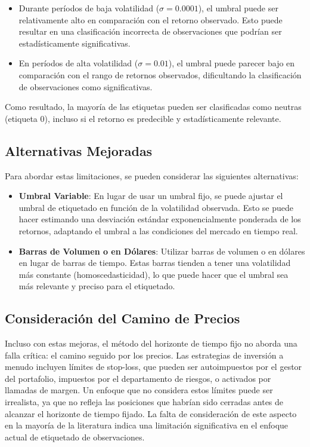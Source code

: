 \documentclass[a4paper,12pt]{report}
\begin{document}
\begin{itemize}
    \item Durante períodos de baja volatilidad (\(\sigma = 0.0001\)), el umbral puede ser relativamente alto en comparación con el retorno observado. Esto puede resultar en una clasificación incorrecta de observaciones que podrían ser estadísticamente significativas.
    \item En períodos de alta volatilidad (\(\sigma = 0.01\)), el umbral puede parecer bajo en comparación con el rango de retornos observados, dificultando la clasificación de observaciones como significativas.
\end{itemize}

Como resultado, la mayoría de las etiquetas pueden ser clasificadas como neutras (etiqueta 0), incluso si el retorno es predecible y estadísticamente relevante.

\subsection{Alternativas Mejoradas}

Para abordar estas limitaciones, se pueden considerar las siguientes alternativas:

\begin{itemize}
    \item \textbf{Umbral Variable}: En lugar de usar un umbral fijo, se puede ajustar el umbral de etiquetado en función de la volatilidad observada. Esto se puede hacer estimando una desviación estándar exponencialmente ponderada de los retornos, adaptando el umbral a las condiciones del mercado en tiempo real.
    \item \textbf{Barras de Volumen o en Dólares}: Utilizar barras de volumen o en dólares en lugar de barras de tiempo. Estas barras tienden a tener una volatilidad más constante (homoscedasticidad), lo que puede hacer que el umbral sea más relevante y preciso para el etiquetado.
\end{itemize}

\subsection{Consideración del Camino de Precios}

Incluso con estas mejoras, el método del horizonte de tiempo fijo no aborda una falla crítica: el camino seguido por los precios. Las estrategias de inversión a menudo incluyen límites de stop-loss, que pueden ser autoimpuestos por el gestor del portafolio, impuestos por el departamento de riesgos, o activados por llamadas de margen. Un enfoque que no considera estos límites puede ser irrealista, ya que no refleja las posiciones que habrían sido cerradas antes de alcanzar el horizonte de tiempo fijado. La falta de consideración de este aspecto en la mayoría de la literatura indica una limitación significativa en el enfoque actual de etiquetado de observaciones.
\end{document}
